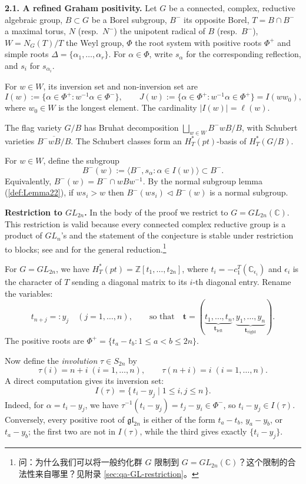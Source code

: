 \medskip
\noindent\textbf{2.1. A refined Graham positivity.} Let $G$ be a connected, complex, reductive algebraic group, $B \subset G$ be a Borel subgroup, $B^{-}$ its opposite Borel, $T = B \cap B^{-}$ a maximal torus, $N$ (resp.\ $N^{-}$) the unipotent radical of $B$ (resp.\ $B^{-}$), $W = N_G(T)/T$ the Weyl group, $\Phi$ the root system with positive roots $\Phi^{+}$ and simple roots $\Delta = \{\alpha_1, \ldots, \alpha_r\}$. For $\alpha \in \Phi$, write $s_\alpha$ for the corresponding reflection, and $s_i$ for $s_{\alpha_i}$.

For $w \in W$, its inversion set and non-inversion set are
$$I(w) := \{\alpha \in \Phi^{+} : w^{-1}\alpha \in \Phi^{-}\},\qquad J(w) := \{\alpha \in \Phi^{+} : w^{-1}\alpha \in \Phi^{+}\} = I(ww_0),$$
where $w_0 \in W$ is the longest element. The cardinality $|I(w)| = \ell(w)$.

The flag variety $G/B$ has Bruhat decomposition $\bigsqcup_{w \in W} B^{-}wB/B$, with Schubert varieties $\overline{B^{-}wB/B}$. The Schubert classes form an $H_T^*(pt)$-basis of $H_T^*(G/B)$.

For $w \in W$, define the subgroup
$$B^-(w) := \langle B^-, s_\alpha : \alpha \in I(w) \rangle \subset B^-.$$
Equivalently, $B^-(w) = B^- \cap wBw^{-1}$. By the normal subgroup lemma (\cref{def:Lemma22}), if $ws_i > w$ then $B^-(ws_i) \triangleleft B^-(w)$ is a normal subgroup.

\medskip
\noindent\textbf{Restriction to $GL_{2n}$.} In the body of the proof we restrict to $G = GL_{2n}(\mathbb{C})$. This restriction is valid because every connected complex reductive group is a product of $GL_n$'s and the statement of the conjecture is stable under restriction to blocks; see \cite[Section 1.4]{GX2025} and \cite[Section 10.4]{AndersonFulton} for the general reduction.\footnote{问：为什么我们可以将一般约化群 $G$ 限制到 $G = GL_{2n}(\mathbb{C})$？这个限制的合法性来自哪里？见附录 \cref{sec:qa-GL-restriction}。}

For $G = GL_{2n}$, we have $H_T^*(pt) = \mathbb{Z}[t_1,\ldots,t_{2n}]$, where $t_i = -c_1^T(\mathbb{C}_{\epsilon_i})$ and $\epsilon_i$ is the character of $T$ sending a diagonal matrix to its $i$-th diagonal entry. Rename the variables:
$$t_{n+j} =: y_j\quad (j=1,\ldots,n),\qquad\text{so that}\quad \mathbf{t} = (\underbrace{t_1,\ldots,t_n}_{\mathbf{t}_\mathrm{left}},\underbrace{y_1,\ldots,y_n}_{\mathbf{t}_\mathrm{right}}).$$
The positive roots are $\Phi^+ = \{t_a - t_b : 1 \leq a < b \leq 2n\}$.

Now define the \emph{involution} $\tau \in S_{2n}$ by
$$\tau(i) = n+i\;(i=1,\ldots,n),\qquad \tau(n+i)=i\;(i=1,\ldots,n).$$
A direct computation gives its inversion set:
$$I(\tau) = \{\, t_i - y_j \mid 1 \leq i,j \leq n \,\}.$$
Indeed, for $\alpha = t_i - y_j$, we have $\tau^{-1}(t_i - y_j) = t_j - y_i \in \Phi^{-}$, so $t_i - y_j \in I(\tau)$. Conversely, every positive root of $\mathfrak{gl}_{2n}$ is either of the form $t_a - t_b$, $y_a - y_b$, or $t_a - y_b$; the first two are not in $I(\tau)$, while the third gives exactly $\{t_i - y_j\}$.

